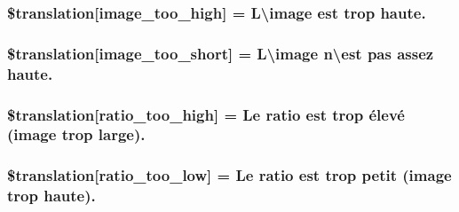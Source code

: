 \subsubsection[{\$translation}]{\setlength{\rightskip}{0pt plus 5cm}\$translation\mbox{[}\textquotesingle{}image\+\_\+too\+\_\+high\textquotesingle{}\mbox{]} = \textquotesingle{}L\textbackslash{}image est trop haute.\textquotesingle{}}\label{class_8upload_8fr___f_r_8php_aa27bde361343f3b63c7cd441860024f8}
\hypertarget{class_8upload_8fr___f_r_8php_a86fcd4e1157b00032df451188d735527}{}
\subsubsection[{\$translation}]{\setlength{\rightskip}{0pt plus 5cm}\$translation\mbox{[}\textquotesingle{}image\+\_\+too\+\_\+short\textquotesingle{}\mbox{]} = \textquotesingle{}L\textbackslash{}image n\textbackslash{}est pas assez haute.\textquotesingle{}}\label{class_8upload_8fr___f_r_8php_a86fcd4e1157b00032df451188d735527}
\hypertarget{class_8upload_8fr___f_r_8php_a23396f6ce7f31e5e5f1b57580621d982}{}
\subsubsection[{\$translation}]{\setlength{\rightskip}{0pt plus 5cm}\$translation\mbox{[}\textquotesingle{}ratio\+\_\+too\+\_\+high\textquotesingle{}\mbox{]} = \textquotesingle{}Le ratio est trop élevé (image trop large).\textquotesingle{}}\label{class_8upload_8fr___f_r_8php_a23396f6ce7f31e5e5f1b57580621d982}
\hypertarget{class_8upload_8fr___f_r_8php_ac533b9a479f056b0b8623e4268f068c2}{}
\subsubsection[{\$translation}]{\setlength{\rightskip}{0pt plus 5cm}\$translation\mbox{[}\textquotesingle{}ratio\+\_\+too\+\_\+low\textquotesingle{}\mbox{]} = \textquotesingle{}Le ratio est trop petit (image trop haute).\textquotesingle{}}\label{class_8upload_8fr___f_r_8php_ac533b9a479f056b0b8623e4268f068c2}
\hypertarget{class_8upload_8fr___f_r_8php_aa4051ef64e94a3f8295c63cf85544016}{}
